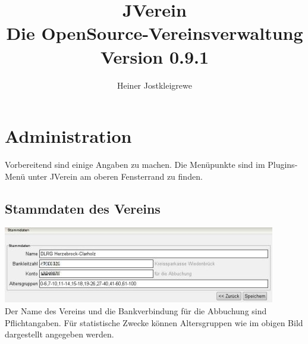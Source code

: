 \documentclass[a4paper,BCOR30mm,DIV14,pdftex,liststotoc,footsepline,openany]{scrbook}
\author{Heiner Jostkleigrewe}
\title{JVerein \\ Die OpenSource-Vereinsverwaltung\\Version 0.9.1}
\begin{document}
\maketitle
\tableofcontents

\chapter{Administration}
Vorbereitend sind einige Angaben zu machen. Die Menüpunkte sind im Plugins-Menü unter JVerein am oberen Fensterrand zu finden.

\section{Stammdaten des Vereins}
\includegraphics{./screenshots/stammdaten.jpg}\\
Der Name des Vereins und die Bankverbindung für die Abbuchung sind Pflichtangaben. Für statistische Zwecke können
Altersgruppen wie im obigen Bild dargestellt angegeben werden.
\end{document}

